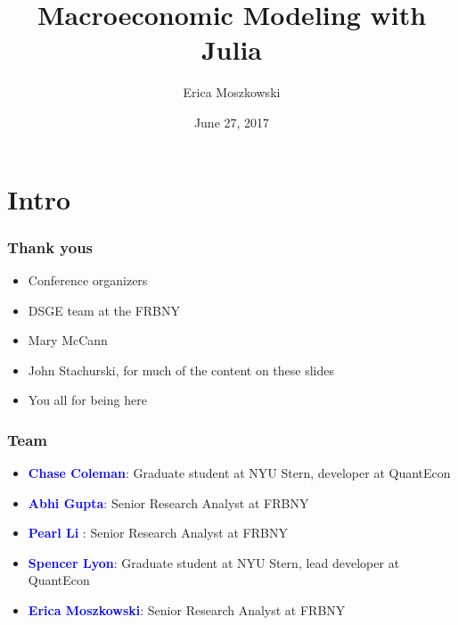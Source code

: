 \documentclass[
  xcolor={svgnames},
  hyperref={colorlinks,citecolor=DeepPink4,linkcolor=DarkRed,urlcolor=DarkBlue}
  ]{beamer}  %
\title{Macroeconomic Modeling with Julia}
\author{Erica Moszkowski}
\institute[FRBNY]{Federal Reserve Bank of New York}
\date{June 27, 2017}
\newcommand\boldblue[1]{\textcolor{blue}{\textbf{#1}}}
\begin{document}
\maketitle

\section{Intro}
\begin{frame}
  \frametitle{Thank yous}

  \begin{itemize}
    \setlength\itemsep{1em}
    \item Conference organizers
    \item DSGE team at the FRBNY
    \item Mary McCann
    \item John Stachurski, for much of the content on these slides
    \item You all for being here
  \end{itemize}
\end{frame}

\begin{frame}
  \frametitle{Team}

  \begin{itemize}
    \setlength\itemsep{1em}
    \item \boldblue{Chase Coleman}: Graduate student at NYU Stern, developer at QuantEcon \\
    \item \boldblue{Abhi Gupta}: Senior Research Analyst at FRBNY \\
    \item \boldblue{Pearl Li }: Senior Research Analyst at FRBNY \\
    \item \boldblue{Spencer Lyon}: Graduate student at NYU Stern, lead developer at QuantEcon \\
    \item \boldblue{Erica Moszkowski}: Senior Research Analyst at FRBNY

  \end{itemize}
\end{frame}
\end{document}

